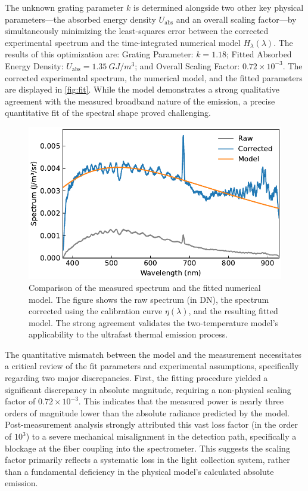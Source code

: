 \documentclass[
	a4paper,
]{scrarticle}
\begin{document}
The unknown grating parameter $k$ is determined alongside two other key physical parameters—the absorbed energy density $U_{\text{abs}}$ and an overall scaling factor—by simultaneously minimizing the least-squares error between the corrected experimental spectrum and the time-integrated numerical model $H_\lambda(\lambda)$. The results of this optimization are: Grating Parameter: $k=1.18$; Fitted Absorbed Energy Density: $U_{\text{abs}} = \SI{1.35}{GJ/m^3}$; and Overall Scaling Factor: $0.72 \times 10^{-3}$. The corrected experimental spectrum, the numerical model, and the fitted parameters are displayed in \autoref{fig:fit}. While the model demonstrates a strong qualitative agreement with the measured broadband nature of the emission, a precise quantitative fit of the spectral shape proved challenging.

\begin{figure}[h]
    \centering
    \includegraphics{../analysis/figures/combined.fit.pdf}
    \caption{Comparison of the measured spectrum and the fitted numerical model. The figure shows the raw spectrum (in DN), the spectrum corrected using the calibration curve $\eta(\lambda)$, and the resulting fitted model. The strong agreement validates the two-temperature model's applicability to the ultrafast thermal emission process.}
    \label{fig:fit}
\end{figure}

The quantitative mismatch between the model and the measurement necessitates a critical review of the fit parameters and experimental assumptions, specifically regarding two major discrepancies. First, the fitting procedure yielded a significant discrepancy in absolute magnitude, requiring a non-physical scaling factor of $0.72 \times 10^{-3}$. This indicates that the measured power is nearly three orders of magnitude lower than the absolute radiance predicted by the model. Post-measurement analysis strongly attributed this vast loss factor (in the order of $10^3$) to a severe mechanical misalignment in the detection path, specifically a blockage at the fiber coupling into the spectrometer. This suggests the scaling factor primarily reflects a systematic loss in the light collection system, rather than a fundamental deficiency in the physical model's calculated absolute emission.
\end{document}
